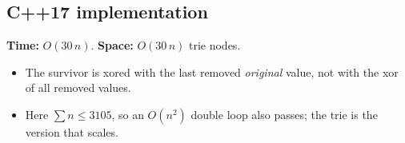 \subsection*{C++17 implementation}

\begin{complexitybox}
\textbf{Time:} $O(30\,n)$. \textbf{Space:} $O(30\,n)$ trie nodes.
\end{complexitybox}

\begin{pitfallbox}
\begin{itemize}
  \item The survivor is xored with the last removed \emph{original} value,
        not with the xor of all removed values.
  \item Here $\sum n\le3105$, so an $O(n^2)$ double loop also passes; the trie
        is the version that scales.
\end{itemize}
\end{pitfallbox}
